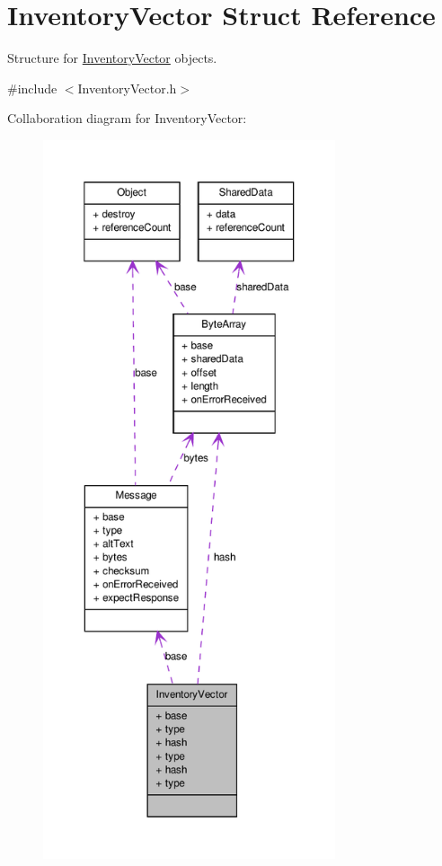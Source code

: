 \hypertarget{struct_inventory_vector}{
\section{InventoryVector Struct Reference}
\label{struct_inventory_vector}
}


Structure for \hyperlink{struct_inventory_vector}{InventoryVector} objects.  




{\ttfamily \#include $<$InventoryVector.h$>$}



Collaboration diagram for InventoryVector:
\nopagebreak
\begin{figure}[H]
\begin{center}
\leavevmode
\includegraphics[height=600pt]{struct_inventory_vector__coll__graph}
\end{center}
\end{figure}
